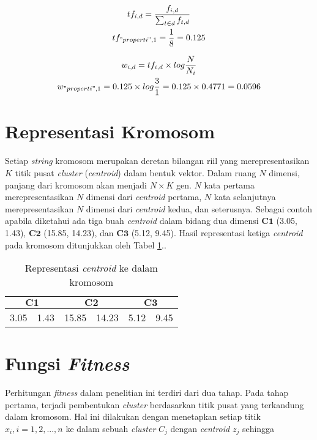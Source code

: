 \begin{equation}
	\label{eq:tf-idf-ex1}
	\begin{gathered}
 	tf_{i,d}=\frac{f_{i,d}}{\sum_{t \in d}f_{t,d}} \\
	tf_{"properti",1}=\frac{1}{8}=0.125 \\
	\end{gathered}
\end{equation}
	
\begin{equation}
	\label{eq:tf-idf-ex2}
	\begin{gathered}
	w_{i,d}=tf_{i,d} \times log \frac{N}{N_i} \\
	w_{"properti",1}=0.125 \times log \frac{3}{1} = 0.125 \times 0.4771 = 0.0596
	\end{gathered}
\end{equation}

\section{Representasi Kromosom}
Setiap \textit{string} kromosom merupakan deretan bilangan riil yang merepresentasikan $K$ titik pusat \textit{cluster} (\textit{centroid}) dalam bentuk vektor. Dalam ruang $N$ dimensi, panjang dari kromosom akan menjadi $N\times K$ gen. $N$ kata pertama merepresentasikan $N$ dimensi dari \textit{centroid} pertama, $N$ kata selanjutnya merepresentasikan $N$ dimensi dari \textit{centroid} kedua, dan seterusnya. Sebagai contoh apabila diketahui ada tiga buah \textit{centroid} dalam bidang dua dimensi $\mathbf{C1}$ (3.05, 1.43), $\mathbf{C2}$ (15.85, 14.23), dan $\mathbf{C3}$ (5.12, 9.45). Hasil representasi ketiga \textit{centroid} pada kromosom ditunjukkan oleh Tabel \ref{tbl:chromosome}..

\begin{table}[h]
	\centering
	\begin{tabular}{|c|c|c|c|c|c|}
		\multicolumn{2}{c}{\textbf{$\mathbf{C1}$}} & \multicolumn{2}{c}{\textbf{$\mathbf{C2}$}} & \multicolumn{2}{c}{$\mathbf{C3}$}\\ \hline
		3.05 & 1.43 & 15.85 & 14.23 & 5.12 & 9.45\\ \hline
	\end{tabular}
	\caption{Representasi \textit{centroid} ke dalam kromosom}
	\label{tbl:chromosome}
\end{table}

\section{Fungsi \textit{Fitness}}
Perhitungan \textit{fitness} dalam penelitian ini terdiri dari dua tahap. Pada tahap pertama, terjadi pembentukan \textit{cluster} berdasarkan titik pusat yang terkandung dalam kromosom. Hal ini dilakukan dengan menetapkan setiap titik $x_i,i=1,2, ... ,n$ ke dalam sebuah \textit{cluster} $C_j$ dengan \textit{centroid} $z_j$ sehingga

